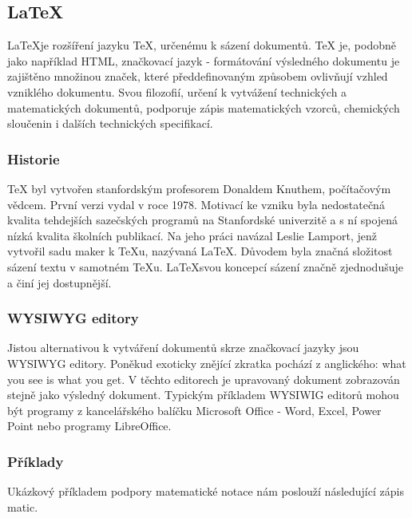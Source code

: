 \documentclass[main.tex]{subfiles}
\begin{document}
\subsection{\LaTeX}
\label{latex}
\LaTeX je rozšíření jazyku TeX, určenému k sázení dokumentů. TeX je, podobně jako například HTML, značkovací jazyk - formátování výsledného dokumentu je zajištěno množinou značek, které předdefinovaným způsobem ovlivňují vzhled vzniklého dokumentu. Svou filozofií, určení k vytvážení technických a matematických dokumentů, podporuje zápis matematických vzorců, chemických sloučenin i dalších technických specifikací. 

\subsubsection{Historie}
TeX byl vytvořen stanfordským profesorem Donaldem Knuthem, počítačovým vědcem. První verzi vydal v roce 1978. Motivací ke vzniku byla nedostatečná kvalita tehdejších sazečských programů na Stanfordské univerzitě a s ní spojená nízká kvalita školních publikací. Na jeho práci navázal Leslie Lamport, jenž vytvořil sadu maker k TeXu, nazývaná \LaTeX. Důvodem byla značná složitost sázení textu v samotném TeXu. \LaTeX svou koncepcí sázení značně zjednodušuje a činí jej dostupnější. 


\subsubsection{WYSIWYG editory}
Jistou alternativou k vytváření dokumentů skrze značkovací jazyky jsou WYSIWYG editory. Poněkud exoticky znějící zkratka pochází z anglického: what you see is what you get. V těchto editorech je upravovaný dokument zobrazován stejně jako výsledný dokument. Typickým příkladem WYSIWIG editorů mohou být programy z kancelářského balíčku Microsoft Office - Word, Excel, Power Point nebo programy LibreOffice.



\subsubsection{Příklady}
Ukázkový příkladem podpory matematické notace nám poslouží následující zápis matic.
\end{document}
